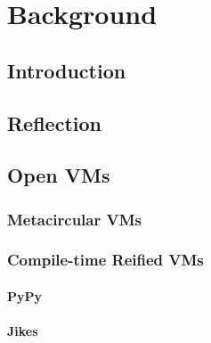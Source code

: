 
\chapter{Background}
\minitoc
\section{Introduction}

\section{Reflection}


\section{Open VMs}

\subsection{Metacircular VMs}


\subsection{Compile-time Reified VMs}
\subsubsection{PyPy}

\subsubsection{Jikes}


